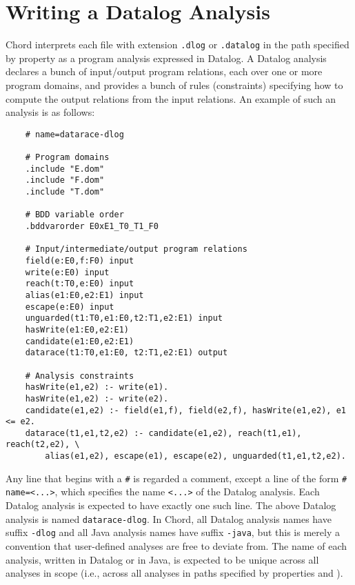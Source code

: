 \section{Writing a Datalog Analysis}
\label{sec:writing-datalog-analysis}

Chord interprets each file with extension {\tt .dlog} or {\tt .datalog} in the path specified by
property  as a program analysis expressed in Datalog.
A Datalog analysis declares a bunch of input/output program relations,
each over one or more program domains, and provides a bunch of rules (constraints)
specifying how to compute the output relations from the input relations.
An example of such an analysis is as follows:

\begin{verbatim}
    # name=datarace-dlog

    # Program domains
    .include "E.dom"
    .include "F.dom"
    .include "T.dom"

    # BDD variable order
    .bddvarorder E0xE1_T0_T1_F0

    # Input/intermediate/output program relations
    field(e:E0,f:F0) input
    write(e:E0) input
    reach(t:T0,e:E0) input
    alias(e1:E0,e2:E1) input
    escape(e:E0) input
    unguarded(t1:T0,e1:E0,t2:T1,e2:E1) input
    hasWrite(e1:E0,e2:E1)
    candidate(e1:E0,e2:E1) 
    datarace(t1:T0,e1:E0, t2:T1,e2:E1) output

    # Analysis constraints
    hasWrite(e1,e2) :- write(e1).
    hasWrite(e1,e2) :- write(e2).
    candidate(e1,e2) :- field(e1,f), field(e2,f), hasWrite(e1,e2), e1 <= e2.
    datarace(t1,e1,t2,e2) :- candidate(e1,e2), reach(t1,e1), reach(t2,e2), \
        alias(e1,e2), escape(e1), escape(e2), unguarded(t1,e1,t2,e2).
\end{verbatim}

Any line that begins with a {\tt \#} is regarded a comment, except a
line of the form {\tt \#} {\tt name=<...>}, which specifies the name
{\tt <...>} of the Datalog analysis.
Each Datalog analysis is expected to have exactly one such line.
The above Datalog analysis is named {\tt datarace-dlog}.
In Chord, all Datalog analysis names have suffix
{\tt -dlog} and all Java analysis names have suffix {\tt -java}, but
this is merely a convention that user-defined analyses are free to deviate from.
The name of each analysis, written in Datalog or in Java, is expected to be
unique across all analyses in scope (i.e., across all analyses in paths
specified by properties \code{chord.dlog.analysis.path} and ).

